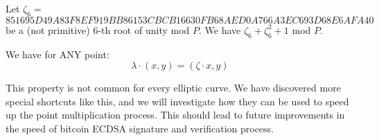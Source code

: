 Let
$\zeta_6 =$\\
$ 851695D49A83F8EF919BB86153CBCB16630FB68AED0A766A3EC693D68E6AFA40$
be a (not primitive) 6-th root of unity mod $P$.
We have $\zeta_6+\zeta_6^2+1$ mod $P$.


%



We have for ANY point:
$$
\lambda\cdot (x,y) = (\zeta\cdot x,y)
$$

This property is not common for every elliptic curve. We have discovered more special shortcuts like this, and we will investigate how they can be used to speed up the point multiplication process. This should lead to future improvements in the speed of bitcoin ECDSA signature and verification process.